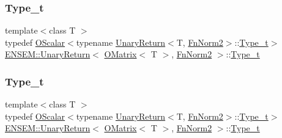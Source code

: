 \subsubsection{\texorpdfstring{Type\_t}{Type\_t}\hspace{0.1cm}{\footnotesize\ttfamily [1/3]}}
{\footnotesize\ttfamily template$<$class T $>$ \\
typedef \mbox{\hyperlink{classENSEM_1_1OScalar}{O\+Scalar}}$<$typename \mbox{\hyperlink{structENSEM_1_1UnaryReturn}{Unary\+Return}}$<$T, \mbox{\hyperlink{structENSEM_1_1FnNorm2}{Fn\+Norm2}}$>$\+::\mbox{\hyperlink{structENSEM_1_1UnaryReturn_3_01OMatrix_3_01T_01_4_00_01FnNorm2_01_4_a4ec82ac7d8a71ef886cafde5b7ecff03}{Type\+\_\+t}}$>$ \mbox{\hyperlink{structENSEM_1_1UnaryReturn}{E\+N\+S\+E\+M\+::\+Unary\+Return}}$<$ \mbox{\hyperlink{classENSEM_1_1OMatrix}{O\+Matrix}}$<$ T $>$, \mbox{\hyperlink{structENSEM_1_1FnNorm2}{Fn\+Norm2}} $>$\+::\mbox{\hyperlink{structENSEM_1_1UnaryReturn_3_01OMatrix_3_01T_01_4_00_01FnNorm2_01_4_a4ec82ac7d8a71ef886cafde5b7ecff03}{Type\+\_\+t}}}

\mbox{\label{structENSEM_1_1UnaryReturn_3_01OMatrix_3_01T_01_4_00_01FnNorm2_01_4_a4ec82ac7d8a71ef886cafde5b7ecff03}} 
\subsubsection{\texorpdfstring{Type\_t}{Type\_t}\hspace{0.1cm}{\footnotesize\ttfamily [2/3]}}
{\footnotesize\ttfamily template$<$class T $>$ \\
typedef \mbox{\hyperlink{classENSEM_1_1OScalar}{O\+Scalar}}$<$typename \mbox{\hyperlink{structENSEM_1_1UnaryReturn}{Unary\+Return}}$<$T, \mbox{\hyperlink{structENSEM_1_1FnNorm2}{Fn\+Norm2}}$>$\+::\mbox{\hyperlink{structENSEM_1_1UnaryReturn_3_01OMatrix_3_01T_01_4_00_01FnNorm2_01_4_a4ec82ac7d8a71ef886cafde5b7ecff03}{Type\+\_\+t}}$>$ \mbox{\hyperlink{structENSEM_1_1UnaryReturn}{E\+N\+S\+E\+M\+::\+Unary\+Return}}$<$ \mbox{\hyperlink{classENSEM_1_1OMatrix}{O\+Matrix}}$<$ T $>$, \mbox{\hyperlink{structENSEM_1_1FnNorm2}{Fn\+Norm2}} $>$\+::\mbox{\hyperlink{structENSEM_1_1UnaryReturn_3_01OMatrix_3_01T_01_4_00_01FnNorm2_01_4_a4ec82ac7d8a71ef886cafde5b7ecff03}{Type\+\_\+t}}}

